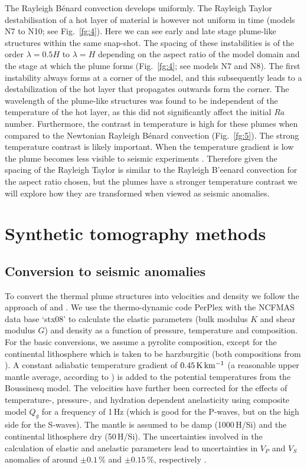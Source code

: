 \documentclass[a4paper,10pt,twocolumn]{paper}
\begin{document}
The Rayleigh B{\'e}nard convection develops uniformly. The Rayleigh Taylor destabilisation of a hot layer of material is however not uniform in time (models N7 to N10; see Fig.~\ref{fg:4}). Here we can see early and late stage plume-like structures within the same snap-shot. The spacing of these instabilities is of the order $\lambda = 0.5H$ to $\lambda = H$ depending on the aspect ratio of the model domain and the stage at which the plume forms (Fig.~\ref{fg:4}; see models N7 and N8). The first instability always forms at a corner of the model, and this subsequently leads to a destabilization of the hot layer that propagates outwards form the corner. The wavelength of the plume-like structures was found to be independent of the temperature of the hot layer, as this did not significantly affect the initial $Ra$ number. Furthermore, the contrast in temperature is high for these plumes when compared to the Newtonian Rayleigh B{\'e}nard convection (Fig.~\ref{fg:5}). The strong temperature contrast is likely important. When the temperature gradient is low the plume becomes less visible to seismic experiments \citep{styles-etal-2011}. Therefore given the spacing of the Rayleigh Taylor is similar to the Rayleigh B{'e}enard convection for the aspect ratio chosen, but the plumes have a stronger temperature contrast we will explore how they are transformed when viewed as seismic anomalies.

\section{Synthetic tomography methods}

\subsection{Conversion to seismic anomalies}

To convert the thermal plume structures into velocities and density we follow the approach of \cite{cobden-etal-2008} and \cite{styles-etal-2011}. We use the thermo-dynamic code PerPlex \citep{connolly-2005} with the NCFMAS data base ‘stx08’ \citep{xu-etal-2008} to calculate the elastic parameters (bulk modulus $K$ and shear modulus $G$) and density as a function of pressure, temperature and composition. For the basic conversions, we assume a pyrolite composition, except for the continental lithosphere which is taken to be harzburgitic (both compositions from \citealp{xu-etal-2008}). A constant adiabatic temperature gradient of $0.45\rm\,K\,km^{-1}$ (a reasonable upper mantle average, according to \citealp{styles-etal-2011}) is added to the potential temperatures from the Boussinesq model. The velocities have further been corrected for the effects of temperature-, pressure-, and hydration dependent anelasticity using composite model $Q_{g}$ \citep{goes-etal-2012,vanwijk-etal-2008} for a frequency of 1\,Hz (which is good for the P-waves, but on the high side for the S-waves). The mantle is assumed to be damp (1000\,H/Si) and the continental lithosphere dry (50\,H/Si). The uncertainties involved in the calculation of elastic and anelastic parameters lead to uncertainties in $V_{P}$ and $V_{S}$ anomalies of around $\pm0.1$\,\% and $\pm 0.15$\,\%, respectively \citep{cammarano-etal-2003,styles-etal-2011}.
\end{document}
